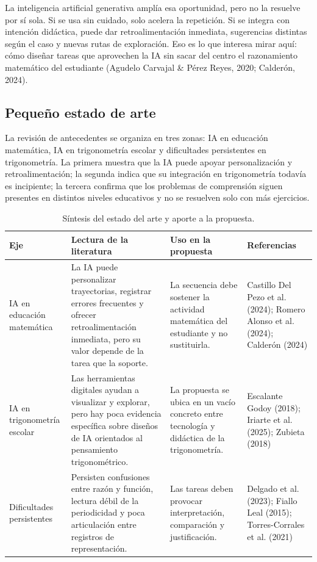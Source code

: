 \documentclass[11pt,spanish,letterpaper,openany]{book}
\begin{document}
La inteligencia artificial generativa amplía esa oportunidad, pero no la resuelve por sí sola. Si se usa sin cuidado, solo acelera la repetición. Si se integra con intención didáctica, puede dar retroalimentación inmediata, sugerencias distintas según el caso y nuevas rutas de exploración. Eso es lo que interesa mirar aquí: cómo diseñar tareas que aprovechen la IA sin sacar del centro el razonamiento matemático del estudiante (Agudelo Carvajal \& Pérez Reyes, 2020; Calderón, 2024).

\subsection{Pequeño estado de arte}

La revisión de antecedentes se organiza en tres zonas: IA en educación matemática, IA en trigonometría escolar y dificultades persistentes en trigonometría. La primera muestra que la IA puede apoyar personalización y retroalimentación; la segunda indica que su integración en trigonometría todavía es incipiente; la tercera confirma que los problemas de comprensión siguen presentes en distintos niveles educativos y no se resuelven solo con más ejercicios.

\begin{table}[H]
\centering
\caption{Síntesis del estado del arte y aporte a la propuesta.}
\begin{tabularx}{\textwidth}{>{\raggedright\arraybackslash}p{3.1cm} >{\raggedright\arraybackslash}X >{\raggedright\arraybackslash}X >{\raggedright\arraybackslash}p{4.1cm}}
\toprule
Eje & Lectura de la literatura & Uso en la propuesta & Referencias \\
\midrule
IA en educación matemática & La IA puede personalizar trayectorias, registrar errores frecuentes y ofrecer retroalimentación inmediata, pero su valor depende de la tarea que la soporte. & La secuencia debe sostener la actividad matemática del estudiante y no sustituirla. & Castillo Del Pezo et al. (2024); Romero Alonso et al. (2024); Calderón (2024) \\
IA en trigonometría escolar & Las herramientas digitales ayudan a visualizar y explorar, pero hay poca evidencia específica sobre diseños de IA orientados al pensamiento trigonométrico. & La propuesta se ubica en un vacío concreto entre tecnología y didáctica de la trigonometría. & Escalante Godoy (2018); Iriarte et al. (2025); Zubieta (2018) \\
Dificultades persistentes & Persisten confusiones entre razón y función, lectura débil de la periodicidad y poca articulación entre registros de representación. & Las tareas deben provocar interpretación, comparación y justificación. & Delgado et al. (2023); Fiallo Leal (2015); Torres-Corrales et al. (2021) \\
\bottomrule
\end{tabularx}
\end{table}
\end{document}
